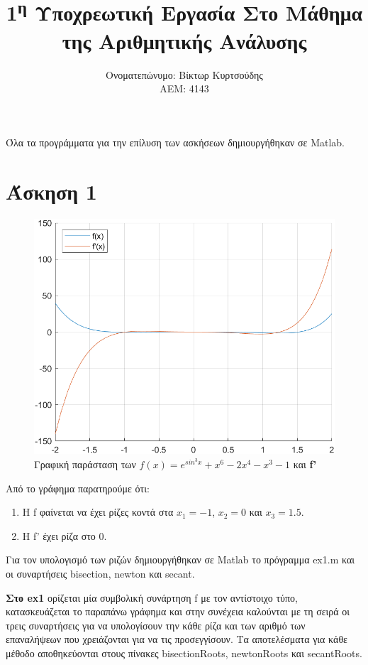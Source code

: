 \documentclass[a4paper,11pt]{article}
\title{1\textsuperscript{η} Υποχρεωτική Εργασία Στο Μάθημα της Αριθμητικής Ανάλυσης}
\author{Ονοματεπώνυμο: Βίκτωρ Κυρτσούδης \\ ΑΕΜ: 4143}
\date{}
\begin{document}
\maketitle
\begin{flushleft}

Όλα τα προγράμματα για την επίλυση των ασκήσεων δημιουργήθηκαν σε Matlab.

\section*{Άσκηση 1}
\begin{figure}[ht]
    \caption*{Γραφική παράσταση των $f(x) = e^{sin^3x}+x^6-2x^4-x^3-1$ και \textbf{f'}}
    \includegraphics[width=\textwidth]{ex1plot.png}
\end{figure}

Από το γράφημα παρατηρούμε ότι:
\begin{enumerate}
    \item Η f φαίνεται να έχει ρίζες κοντά στα $x_1=-1$, $x_2=0$ και $x_3=1.5$.
    \item Η f' έχει ρίζα στο 0.
\end{enumerate}

Για τον υπολογισμό των ριζών δημιουργήθηκαν σε Matlab το πρόγραμμα ex1.m και οι συναρτήσεις bisection, newton και secant.

\textbf{Στο ex1} ορίζεται μία συμβολική συνάρτηση f με τον αντίστοιχο τύπο, κατασκευάζεται το παραπάνω γράφημα και στην συνέχεια καλούνται με τη σειρά οι τρεις συναρτήσεις για να υπολογίσουν την κάθε ρίζα και των αριθμό των επαναλήψεων που χρειάζονται για να τις προσεγγίσουν. Τα αποτελέσματα για κάθε μέθοδο αποθηκεύονται στους πίνακες bisectionRoots, newtonRoots και secantRoots.
\linebreak


\end{flushleft}
\end{document}
